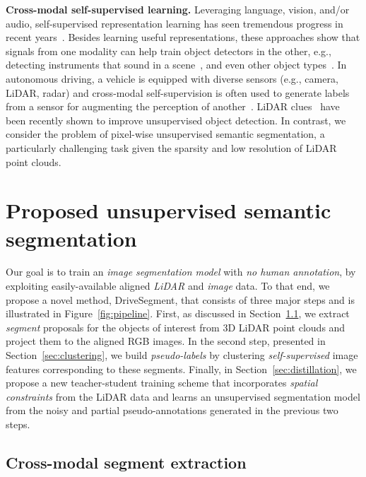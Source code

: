 \documentclass[runningheads]{llncs}
\newcommand{\ours}{DriveSegment\xspace}
\newcommand{\paragraphcustom}[1]{\smallskip\noindent\textbf{#1}}
\begin{document}
\paragraphcustom{Cross-modal self-supervised learning.}
Leveraging language, vision, and/or audio,  self-supervised representation learning has seen tremendous progress in recent years~\cite{alayrac2020self,alwassel_2020_xdc,arandjelovic2017look,miech2020end,owens2018audio,Recasens_2021_ICCV,zhao2018sound}. Besides learning useful representations, these approaches show that signals from one modality can help train object detectors in the other, e.g., detecting instruments that sound in a scene~\cite{chen2021localizing,owens2018audio,zhao2018sound}, and even other object types~\cite{afouras2021self}. In autonomous driving, a vehicle is equipped with diverse sensors (e.g., camera, LiDAR, radar) and cross-modal self-supervision is often used to generate labels from a sensor for augmenting the perception of another~\cite{bartoccioni2021lidartouch,jaritz2020xmuda,tian2021unsupervised,weston2019probably}. LiDAR clues~\cite{tian2021unsupervised} have been recently shown to improve unsupervised object detection. In contrast, we consider the problem of pixel-wise unsupervised semantic segmentation, a particularly challenging task given the sparsity and low resolution of LiDAR point clouds.
 
\section{Proposed unsupervised semantic segmentation}

Our goal is to train an \emph{image segmentation model} with \textit{no human annotation}, by exploiting easily-available aligned \emph{LiDAR} and \emph{image} data. 
To that end, we propose a novel method, \ours, that consists of three major steps and is illustrated in Figure~\ref{fig:pipeline}.
First, as discussed in Section~\ref{sec:segment_extraction}, we extract \emph{segment} proposals for the objects of interest from 3D LiDAR point clouds and project them to the aligned RGB images. In the second step, presented in Section~\ref{sec:clustering}, we build \emph{pseudo-labels} by clustering \emph{self-supervised} image features corresponding to these segments. Finally, in Section~\ref{sec:distillation}, we propose a new teacher-student training scheme that incorporates \emph{spatial constraints} from the LiDAR data and learns an unsupervised segmentation model from the noisy and partial pseudo-annotations generated in the previous two steps.

\subsection{Cross-modal segment extraction}
\label{sec:segment_extraction}
\end{document}
